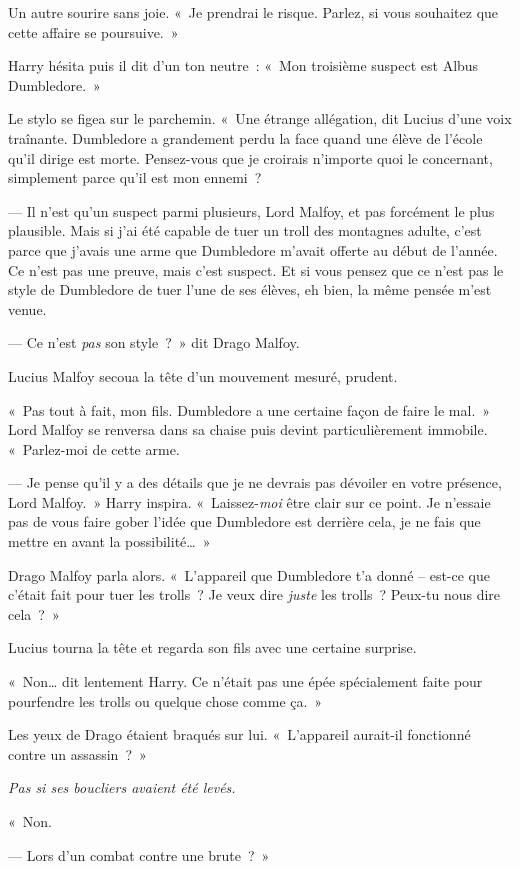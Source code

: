 Un autre sourire sans joie.
«~Je prendrai le risque.
Parlez, si vous souhaitez que cette affaire se poursuive.~»

Harry hésita puis il dit d'un ton neutre~: «~Mon troisième suspect est Albus Dumbledore.~»

Le stylo se figea sur le parchemin.
«~Une étrange allégation, dit Lucius d'une voix traînante.
Dumbledore a grandement perdu la face quand une élève de l'école qu'il dirige est morte.
Pensez-vous que je croirais n'importe quoi le concernant, simplement parce qu'il est mon ennemi~?

--- Il n'est qu'un suspect parmi plusieurs, Lord Malfoy, et pas forcément le plus plausible.
Mais si j'ai été capable de tuer un troll des montagnes adulte, c'est parce que j'avais une arme que Dumbledore m'avait offerte au début de l'année.
Ce n'est pas une preuve, mais c'est suspect.
Et si vous pensez que ce n'est pas le style de Dumbledore de tuer l'une de ses élèves, eh bien, la même pensée m'est venue.

--- Ce n'est \emph{pas} son style~?~»
dit Drago Malfoy.

Lucius Malfoy secoua la tête d'un mouvement mesuré, prudent.

«~Pas tout à fait, mon fils.
Dumbledore a une certaine façon de faire le mal.~»
Lord Malfoy se renversa dans sa chaise puis devint particulièrement immobile.
«~Parlez-moi de cette arme.

--- Je pense qu'il y a des détails que je ne devrais pas dévoiler en votre présence, Lord Malfoy.~»
Harry inspira.
«~Laissez-\emph{moi} être clair sur ce point.
Je n'essaie pas de vous faire gober l'idée que Dumbledore est derrière cela, je ne fais que mettre en avant la possibilité…~»

Drago Malfoy parla alors.
«~L'appareil que Dumbledore t'a donné -- est-ce que c'était fait pour tuer les trolls~?
Je veux dire \emph{juste} les trolls~?
Peux-tu nous dire cela~?~»

Lucius tourna la tête et regarda son fils avec une certaine surprise.

«~Non… dit lentement Harry.
Ce n'était pas une épée spécialement faite pour pourfendre les trolls ou quelque chose comme ça.~»

Les yeux de Drago étaient braqués sur lui.
«~L'appareil aurait-il fonctionné contre un assassin~?~»

\emph{Pas si ses boucliers avaient été levés.}

«~Non.

--- Lors d'un combat contre une brute~?~»

